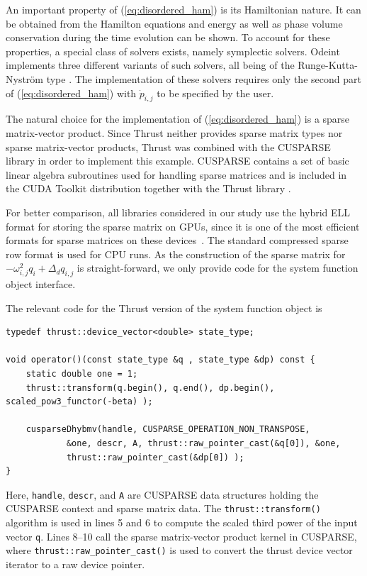 \documentclass[final]{siamltex}
\newcommand{\code}[1]{\lstinline$#1$}
\newcommand{\eqref}[1]{(\ref{#1})}
\begin{document}
An important property of \eqref{eq:disordered_ham} is its Hamiltonian
nature. It can be obtained from the Hamilton equations and energy as well as phase volume conservation during the time
evolution can be shown. To account for these properties, a special class of solvers
exists, namely symplectic solvers. Odeint implements three different
variants of such solvers, all being of the Runge-Kutta-Nystr\"om
type \cite{HairerGeometricNumericalIntegration2006,Leimkuhler-Reich-04}. The
implementation of these solvers requires only the second part
of \eqref{eq:disordered_ham} with $\dot{p}_{i,j}$ to be specified by
the user.



The natural choice for the implementation of \eqref{eq:disordered_ham} is a
sparse matrix-vector product. Since Thrust neither provides sparse matrix
types nor sparse matrix-vector products, Thrust was combined with the
CUSPARSE library in order to implement this example. CUSPARSE contains a set of
basic linear algebra subroutines used for handling sparse matrices and is
included in the CUDA Toolkit distribution together with the Thrust library
\cite{NvidiaCusparseManual}.

For better comparison, all libraries considered in our study use the hybrid ELL
format for storing the sparse matrix on GPUs, since it is one of the most
efficient formats for sparse matrices on these devices~\cite{BellGarland2008}.
The standard compressed sparse row format is used for CPU runs.  As the
construction of the sparse matrix for $- \omega_{i,j}^2 q_i + \Delta_d q_{i,j}$
is straight-forward, we only provide code for the system function object
interface.

The relevant code for the Thrust version of the system function object is
\begin{lstlisting}
typedef thrust::device_vector<double> state_type;

void operator()(const state_type &q , state_type &dp) const {
    static double one = 1;
    thrust::transform(q.begin(), q.end(), dp.begin(), scaled_pow3_functor(-beta) );

    cusparseDhybmv(handle, CUSPARSE_OPERATION_NON_TRANSPOSE,
            &one, descr, A, thrust::raw_pointer_cast(&q[0]), &one,
            thrust::raw_pointer_cast(&dp[0]) );
}
\end{lstlisting}
Here, \code{handle}, \code{descr}, and \code{A} are CUSPARSE data structures
holding the CUSPARSE context and sparse matrix data. The
\code{thrust::transform()} algorithm is used in lines 5 and 6 to compute the
scaled third power of the input vector \code{q}. Lines 8--10 call the sparse
matrix-vector product kernel in CUSPARSE, where
\code{thrust::raw_pointer_cast()} is used to convert the thrust device vector
iterator to a raw device pointer.
\end{document}
